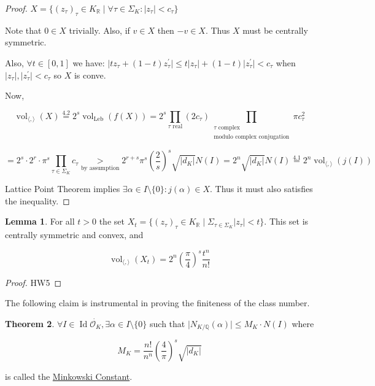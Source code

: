 \documentclass[openany]{amsbook}
\numberwithin{section}{chapter}
\theoremstyle{definition}
\newtheorem{theorem}{Theorem}[chapter]
\newtheorem{lemma}[theorem]{Lemma}
\begin{document}
\begin{proof}
    \(X = \{ (z_\tau)_\tau \in K_\mathbb{R} \mid \forall \tau \in \Sigma_K : \vert z_\tau \vert < c_\tau \} \) 

    Note that \(0\in X\) trivially. Also, if \(v\in X\) then \(-v\in X\). Thus \(X\) must be centrally symmetric.

    Also, \(\forall t\in [0,1]\) we have: \(\vert tz_\tau + (1-t)z_\tau^{\prime}  \vert \leq  t \vert z_\tau \vert + (1-t) \vert z_\tau^{\prime}  \vert < c_\tau\) when \(\vert z_\tau \vert , \vert z_\tau^{\prime} \vert < c_\tau\) so \(X\) is conve.

    Now,
    
    \[
        \operatorname{vol}_{\langle , \rangle}(X) \overset{4.2}{=} 2^s \operatorname{vol}_{\operatorname{Leb}}(f(X)) = 2^s \prod_{\tau \text{ real}}(2 c_\tau) \prod_{\substack{\tau \text{ complex} \\ \text{modulo complex conjugation}}}\pi c_\tau^2
    \]

    \[
        = 2^s \cdot 2^r \cdot \pi ^s \prod_{\tau\in \Sigma_K} c_\tau \underset{\text{by assumption}}{>} 2^{r+s} \pi^s \left( \frac{2}{s} \right)^s \sqrt{\vert d_K \vert } N(I) = 2^n \sqrt{\vert d_K \vert} N(I) \overset{4.1}{=} 2^n \operatorname{vol}_{\langle , \rangle} (j(I)) 
    \]

    Lattice Point Theorem implies \(\exists \alpha \in I \setminus \{ 0 \} : j(\alpha)\in X\). Thus it must also satisfies the inequality.
\end{proof}

\begin{lemma}
    For all \(t > 0\) the set \(X_t = \{ (z_\tau)_{\tau} \in K_\mathbb{R} \mid \Sigma_{\tau \in \Sigma_K} \vert z_\tau \vert < t \} \). This set is centrally symmetric and convex, and
    
    \[
        \operatorname{vol}_{\langle , \rangle}(X_t) = 2^n \left( \frac{\pi}{4} \right) ^s \frac{t^n}{n!}
    \]
\end{lemma}

\begin{proof}
    HW5
\end{proof}

The following claim is instrumental in proving the finiteness of the class number.

\begin{theorem}
    \(\forall I \in \operatorname{Id}\dot{\mathcal{O}_K}, \exists \alpha \in I \setminus \{ 0 \} \) such that \(\vert N_{K/\mathbb{Q}}(\alpha)\vert \leq M_K \cdot N(I)\) where
    
    \[
        M_K = \frac{n!}{n^n} \left( \frac{4}{\pi} \right) ^ s \sqrt{\vert d_K \vert}
    \]

    is called the \underline{Minkowski Constant}.
\end{theorem}
\end{document}
